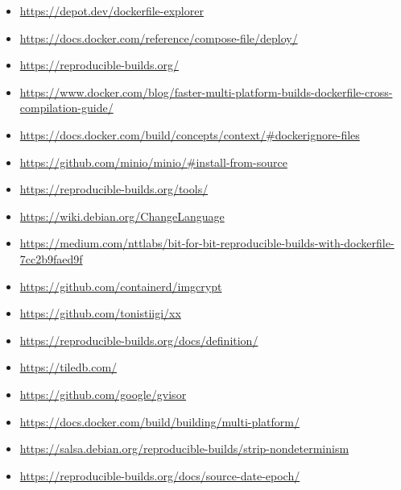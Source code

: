 \documentclass{article}
\begin{document}
\begin{itemize}
  \item \href{https://depot.dev/dockerfile-explorer}{https://depot.dev/dockerfile-explorer}
  \item \href{https://docs.docker.com/reference/compose-file/deploy/}{https://docs.docker.com/reference/compose-file/deploy/}
  \item \href{https://reproducible-builds.org/}{https://reproducible-builds.org/}
  \item \href{https://www.docker.com/blog/faster-multi-platform-builds-dockerfile-cross-compilation-guide/}{https://www.docker.com/blog/faster-multi-platform-builds-dockerfile-cross-compilation-guide/}
  \item \href{https://docs.docker.com/build/concepts/context/\#dockerignore-files}{https://docs.docker.com/build/concepts/context/\#dockerignore-files}
  \item \href{https://github.com/minio/minio/\#install-from-source}{https://github.com/minio/minio/\#install-from-source}
  \item \href{https://reproducible-builds.org/tools/}{https://reproducible-builds.org/tools/}
  \item \href{https://wiki.debian.org/ChangeLanguage}{https://wiki.debian.org/ChangeLanguage}
  \item \href{https://medium.com/nttlabs/bit-for-bit-reproducible-builds-with-dockerfile-7cc2b9faed9f}{https://medium.com/nttlabs/bit-for-bit-reproducible-builds-with-dockerfile-7cc2b9faed9f}
  \item \href{https://github.com/containerd/imgcrypt}{https://github.com/containerd/imgcrypt}
  \item \href{https://github.com/tonistiigi/xx}{https://github.com/tonistiigi/xx}
  \item \href{https://reproducible-builds.org/docs/definition/}{https://reproducible-builds.org/docs/definition/}
  \item \href{https://tiledb.com/}{https://tiledb.com/}
  \item \href{https://github.com/google/gvisor}{https://github.com/google/gvisor}
  \item \href{https://docs.docker.com/build/building/multi-platform/}{https://docs.docker.com/build/building/multi-platform/}
  \item \href{https://salsa.debian.org/reproducible-builds/strip-nondeterminism}{https://salsa.debian.org/reproducible-builds/strip-nondeterminism}
  \item \href{https://reproducible-builds.org/docs/source-date-epoch/}{https://reproducible-builds.org/docs/source-date-epoch/}

\end{itemize}
\end{document}
